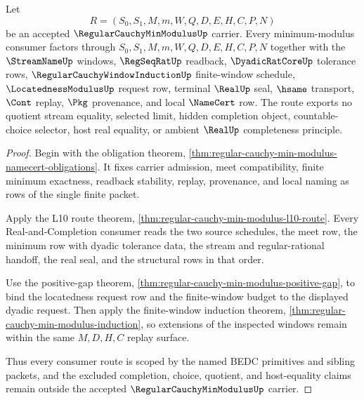 \begin{theorem}
\label{thm:regular-cauchy-min-modulus-scope}
Let
$$
R=(S_0,S_1,M,m,W,Q,D,E,H,C,P,N)
$$
be an accepted $\RegularCauchyMinModulusUp$ carrier. Every minimum-modulus consumer factors through $S_0,S_1,M,m,W,Q,D,E,H,C,P,N$ together with the $\StreamNameUp$ windows, $\RegSeqRatUp$ readback, $\DyadicRatCoreUp$ tolerance rows, $\RegularCauchyWindowInductionUp$ finite-window schedule, $\LocatednessModulusUp$ request row, terminal $\RealUp$ seal, $\hsame$ transport, $\Cont$ replay, $\Pkg$ provenance, and local $\NameCert$ row. The route exports no quotient stream equality, selected limit, hidden completion object, countable-choice selector, host real equality, or ambient $\RealUp$ completeness principle.
\end{theorem}
\begin{proof}
Begin with the obligation theorem, \autoref{thm:regular-cauchy-min-modulus-namecert-obligations}. It fixes carrier admission, meet compatibility, finite minimum exactness, readback stability, replay, provenance, and local naming as rows of the single finite packet.

Apply the L10 route theorem, \autoref{thm:regular-cauchy-min-modulus-l10-route}. Every Real-and-Completion consumer reads the two source schedules, the meet row, the minimum row with dyadic tolerance data, the stream and regular-rational handoff, the real seal, and the structural rows in that order.

Use the positive-gap theorem, \autoref{thm:regular-cauchy-min-modulus-positive-gap}, to bind the locatedness request row and the finite-window budget to the displayed dyadic request. Then apply the finite-window induction theorem, \autoref{thm:regular-cauchy-min-modulus-induction}, so extensions of the inspected windows remain within the same $M,D,H,C$ replay surface.

Thus every consumer route is scoped by the named BEDC primitives and sibling packets, and the excluded completion, choice, quotient, and host-equality claims remain outside the accepted $\RegularCauchyMinModulusUp$ carrier.
\end{proof}



